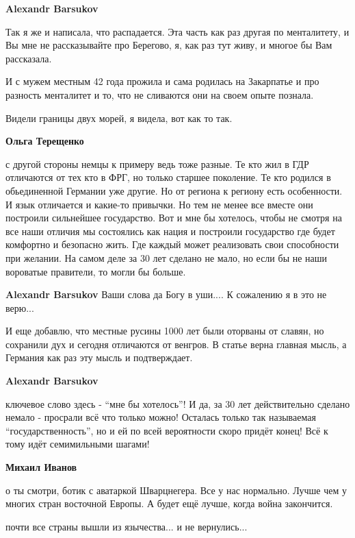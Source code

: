 \begin{itemize}
\begin{itemize}
\textbf{Alexandr Barsukov} 

Так я же и написала, что распадается. Эта часть как раз другая по менталитету,
и Вы мне не рассказывайте про Берегово, я, как раз тут живу, и многое бы Вам
рассказала.

И с мужем местным 42 года прожила и сама родилась на Закарпатье и про разность
менталитет и то, что не сливаются они на своем опыте познала.

Видели границы двух морей, я видела, вот как то так.


\textbf{Ольга Терещенко} 

с другой стороны немцы к примеру ведь тоже разные. Те кто жил в ГДР отличаются
от тех кто в ФРГ, но только старшее поколение. Те кто родился в обьединенной
Германии уже другие. Но от региона к региону есть особенности. И язык
отличается и какие-то привычки. Но тем не менее все вместе они построили
сильнейшее государство. Вот и мне бы хотелось, чтобы не смотря на все наши
отличия мы состоялись как нация и построили государство где будет комфортно и
безопасно жить. Где каждый может реализовать свои способности при желании. На
самом деле за 30 лет сделано не мало, но если бы не наши вороватые правители,
то могли бы больше.

\textbf{Alexandr Barsukov} Ваши слова да Богу в уши....
К сожалению я в это не верю...

И еще добавлю, что местные русины 1000 лет были оторваны от славян, но
сохранили дух и сегодня отличаются от венгров. В статье верна главная мысль, а
Германия как раз эту мысль и подтверждает.

\textbf{Alexandr Barsukov} 

ключевое слово здесь - \enquote{мне бы хотелось}! И да, за 30 лет действительно сделано
немало - просрали всё что только можно! Осталась только так называемая
\enquote{государственность}, но и ей по всей вероятности скоро придёт конец! Всё к
тому идёт семимильными шагами!

\textbf{Михаил Иванов} 

о ты смотри, ботик с аватаркой Шварцнегера. Все у нас нормально. Лучше чем у
многих стран восточной Европы. А будет ещё лучше, когда война закончится.


\end{itemize} %

почти все страны вышли из язычества... и не вернулись...


\end{itemize}
